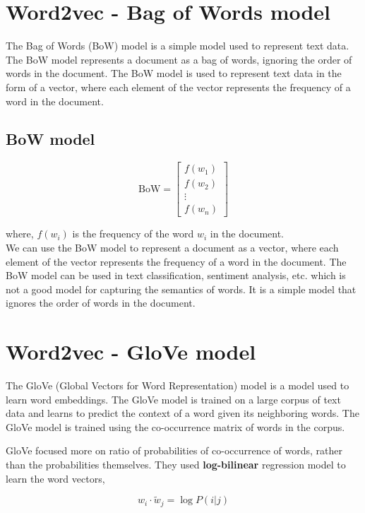 \section{Word2vec - Bag of Words model}

The Bag of Words (BoW) model is a simple model used to represent text data. The BoW model represents a document as a bag of words, ignoring the order of words in the document. 
The BoW model is used to represent text data in the form of a vector, where each element of the vector represents the frequency of a word in the document.

\subsection*{BoW model} 

$$
    \text{BoW} = \left[ \begin{matrix} f(w_1) \\ f(w_2) \\ \vdots \\ f(w_n) \end{matrix} \right]
$$

where, $f(w_i)$ is the frequency of the word $w_i$ in the document.\\

We can use the BoW model to represent a document as a vector, where each element of the vector represents the frequency of a word in the document. The BoW model can be used in text classification, sentiment analysis, etc. which is not a good model for capturing the semantics of words.
It is a simple model that ignores the order of words in the document.

\section{Word2vec - GloVe model}

The GloVe (Global Vectors for Word Representation) model is a model used to learn word embeddings. The GloVe model is trained on a large corpus of text data and learns to predict the context of a word given its neighboring words. 
The GloVe model is trained using the co-occurrence matrix of words in the corpus.

GloVe focused more on ratio of probabilities of co-occurrence of words, rather than the probabilities themselves. 
They used {\bf log-bilinear} regression model to learn the word vectors, 

$$ w_i \cdot \tilde{w}_j = \log P(i|j) $$

